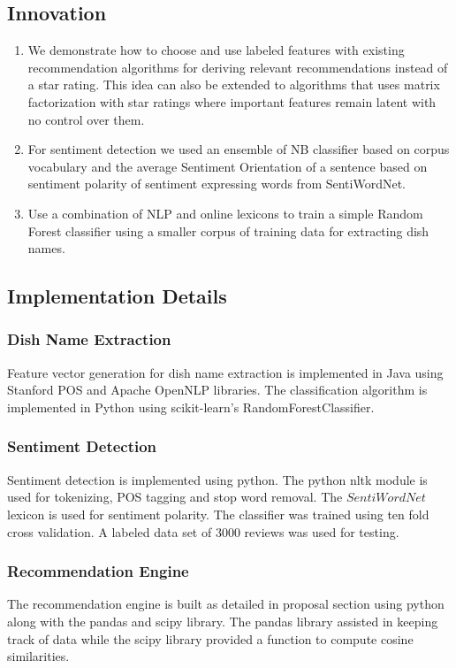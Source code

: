 \documentclass[twoside,12pt]{article}
\begin{document}
\subsection{Innovation}
\begin{enumerate}
\item We demonstrate how to choose and use labeled features with existing recommendation algorithms for deriving relevant recommendations instead of a star rating. This idea can also be extended to algorithms that uses matrix factorization with star ratings where important features remain latent with no control over them.
\item 
For sentiment detection we used an ensemble of NB classifier based on corpus vocabulary and the average Sentiment Orientation of a sentence based on sentiment polarity of sentiment expressing words from SentiWordNet.
\item
Use a combination of NLP and online lexicons to train a simple Random Forest classifier using a smaller corpus of training data for extracting dish names.
\end{enumerate}


\subsection{Implementation Details}

\subsubsection{Dish Name Extraction}
Feature vector generation for dish name extraction is implemented in Java using Stanford POS and Apache OpenNLP libraries. The classification algorithm is implemented in Python using scikit-learn's RandomForestClassifier.

\subsubsection{Sentiment Detection}
Sentiment detection is implemented using python. The python nltk module is used for tokenizing, POS tagging and stop word removal. The $SentiWordNet$  lexicon is used for sentiment polarity. The classifier was trained using ten fold cross validation. A labeled data set of 3000 reviews was used for testing.

\subsubsection{Recommendation Engine}
The recommendation engine is built as detailed in proposal section using python along with the pandas and scipy library. The pandas library assisted in keeping track of data while the scipy library provided a function to compute cosine similarities.
\end{document}
